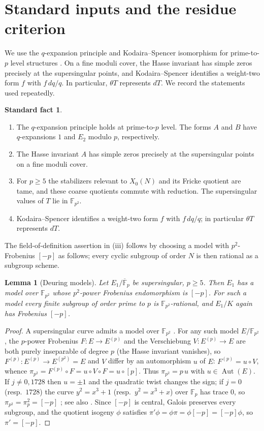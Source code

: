 \documentclass[11pt,a4paper]{article}
\numberwithin{equation}{section}
\newtheorem{lemma}[theorem]{Lemma}
\theoremstyle{definition}
\newtheorem{fact}{Standard fact}
\theoremstyle{remark}
\newcommand{\Fp}{\mathbb F_p}
\newcommand{\Fq}{\mathbb F_{p^2}}
\newcommand{\Fb}{\overline{\mathbb F}_p}
\newcommand{\Aut}{\operatorname{Aut}}
\begin{document}
\section{Standard inputs and the residue criterion}\label{sec:imports}
We use the $q$-expansion principle and Kodaira--Spencer isomorphism for prime-to-$p$
level structures \citep{Katz73,KM85,Gross90}. On a fine moduli cover, the Hasse invariant
has simple zeros precisely at the supersingular points, and Kodaira--Spencer identifies
a weight-two form $f$ with $f\,dq/q$. In particular, $\theta T$ represents $dT$.
We record the statements used repeatedly.
\begin{fact}\label{fact:modp}
\begin{enumerate}[label=\textup{(\roman*)}]
\item The $q$-expansion principle holds at prime-to-$p$ level. The forms
$A$ and $B$ have $q$-expansions $1$ and $E_2$ modulo $p$, respectively.
\item The Hasse invariant $A$ has simple zeros precisely at the
supersingular points on a fine moduli cover.
\item For $p\ge5$ the stabilizers relevant to $X_0(N)$ and its Fricke
quotient are tame, and these coarse quotients commute with reduction.
The supersingular values of $T$ lie in $\Fq$.
\item Kodaira--Spencer identifies a weight-two form $f$ with
$f\,dq/q$; in particular $\theta T$ represents $dT$.
\end{enumerate}
\end{fact}
The field-of-definition assertion in (iii) follows by choosing a model
with $p^2$-Frobenius $[-p]$ as follows; every cyclic subgroup of order
$N$ is then rational as a subgroup scheme.

\begin{lemma}[Deuring models]\label{lem:deuring}
Let $E_1/\Fb$ be supersingular, $p\ge5$. Then $E_1$ has a model over $\Fq$ whose $p^2$-power
Frobenius endomorphism is $[-p]$. For such a model every finite subgroup of order prime to $p$ is
$\Fq$-rational, and $E_1/K$ again has Frobenius $[-p]$.
\end{lemma}
\begin{proof}
A supersingular curve admits a model over $\Fq$
\citep{Deuring41,Waterhouse69}. For any such model $E/\Fq$, the $p$-power Frobenius $F:E\to E^{(p)}$ and the
Verschiebung $V:E^{(p)}\to E$ are both purely inseparable of degree $p$ (the Hasse invariant
vanishes), so $F^{(p)}:E^{(p)}\to E^{(p^2)}=E$ and $V$ differ by an automorphism $u$ of $E$:
$F^{(p)}=u\circ V$, whence $\pi_{p^2}=F^{(p)}\circ F=u\circ V\circ F=u\circ[p]$. Thus
$\pi_{p^2}=p\,u$ with $u\in\Aut(E)$. If $j\ne0,1728$ then $u=\pm1$ and the quadratic twist changes
the sign; if $j=0$ (resp.\ $1728$) the curve $y^2=x^3+1$ (resp.\ $y^2=x^3+x$) over $\Fp$ has
trace $0$, so $\pi_{p^2}=\pi_p^2=[-p]$ \citep{Deuring41,Waterhouse69}; see also
\citet[Lemma~4.3]{Ono25}. Since $[-p]$ is central, Galois preserves every subgroup, and the quotient
isogeny $\phi$ satisfies $\pi'\phi=\phi\pi=\phi[-p]=[-p]\phi$, so $\pi'=[-p]$.
\end{proof}
\end{document}
